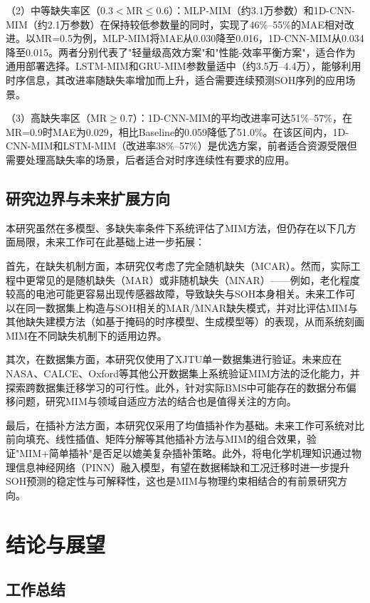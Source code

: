 \documentclass[10pt,a4paper]{ctexart}
\begin{document}
（2）中等缺失率区（0.3$<$MR$\leq$0.6）：MLP-MIM（约3.1万参数）和1D-CNN-MIM（约2.1万参数）在保持较低参数量的同时，实现了46\%--55\%的MAE相对改进。以MR=0.5为例，MLP-MIM将MAE从0.030降至0.016，1D-CNN-MIM从0.034降至0.015。两者分别代表了"轻量级高效方案"和"性能-效率平衡方案"，适合作为通用部署选择。LSTM-MIM和GRU-MIM参数量适中（约3.5万--4.4万），能够利用时序信息，其改进率随缺失率增加而上升，适合需要连续预测SOH序列的应用场景。

（3）高缺失率区（MR$\geq$0.7）：1D-CNN-MIM的平均改进率可达51\%--57\%，在MR=0.9时MAE为0.029，相比Baseline的0.059降低了51.0\%。在该区间内，1D-CNN-MIM和LSTM-MIM（改进率38\%--57\%）是优选方案，前者适合资源受限但需要处理高缺失率的场景，后者适合对时序连续性有要求的应用。

\subsection{研究边界与未来扩展方向}

本研究虽然在多模型、多缺失率条件下系统评估了MIM方法，但仍存在以下几方面局限，未来工作可在此基础上进一步拓展：

首先，在缺失机制方面，本研究仅考虑了完全随机缺失（MCAR）。然而，实际工程中更常见的是随机缺失（MAR）或非随机缺失（MNAR）——例如，老化程度较高的电池可能更容易出现传感器故障，导致缺失与SOH本身相关。未来工作可以在同一数据集上构造与SOH相关的MAR/MNAR缺失模式，并对比评估MIM与其他缺失建模方法（如基于掩码的时序模型、生成模型等）的表现，从而系统刻画MIM在不同缺失机制下的适用边界。

其次，在数据集方面，本研究仅使用了XJTU单一数据集进行验证。未来应在NASA、CALCE、Oxford等其他公开数据集上系统验证MIM方法的泛化能力，并探索跨数据集迁移学习的可行性。此外，针对实际BMS中可能存在的数据分布偏移问题，研究MIM与领域自适应方法的结合也是值得关注的方向。

最后，在插补方法方面，本研究仅采用了均值插补作为基础。未来工作可系统对比前向填充、线性插值、矩阵分解等其他插补方法与MIM的组合效果，验证"MIM+简单插补"是否足以媲美复杂插补策略。此外，将电化学机理知识通过物理信息神经网络（PINN）融入模型，有望在数据稀缺和工况迁移时进一步提升SOH预测的稳定性与可解释性\cite{wang2024pinn}，这也是MIM与物理约束相结合的有前景研究方向。

\section{结论与展望}\label{sec:conclusion}

\subsection{工作总结}
\end{document}
